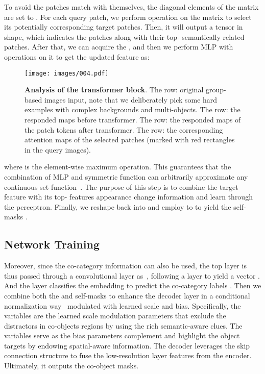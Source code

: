 \documentclass[journal]{IEEEtran}
\begin{document}
To avoid the patches match with themselves, the diagonal elements of the matrix are set to . For each query patch, we perform  operation on the matrix to select its potentially corresponding target patches. Then, it will output a tensor in  shape, which indicates the patches along with their top- semantically related patches. 
After that, we can acquire the , and then we perform MLP with  operations on it to get the updated feature  as:



\begin{figure*}[t]
	\begin{center}
		\centering
		\texttt{[image: images/004.pdf]}
	\end{center}
	
	\caption{\textbf{Analysis of the transformer block}. The  row: original group-based images input, note that we deliberately pick some hard examples with complex backgrounds and multi-objects. The  row: the responded maps before transformer. The  row: the responded maps of the patch tokens after transformer. The  row: the corresponding attention maps of the selected patches (marked with red rectangles in the query images).}
	\label{fig4}
\end{figure*}




where  is the element-wise maximum operation. This guarantees that the combination of MLP and symmetric function can arbitrarily
approximate any continuous set function~\cite{qi2017pointnet}.
The purpose of this step is to combine the target feature with its top- features appearance change information and learn through the perceptron.
Finally, we reshape  back into  and employ  to  to yield the self-masks .





\subsection{Network Training}

Moreover, since the co-category information can also be used, the top layer  is thus passed through a convolutional layer as~\cite{wang2019robust,zhang2020deep}, following a  layer to yield a vector . And the  layer classifies the embedding  to predict the co-category labels .
Then we combine both the  and self-masks  to enhance the decoder layer in a conditional normalization way~\cite{park2019semantic} modulated with learned scale and bias.
Specifically, the variables  are the learned scale modulation parameters that exclude the distractors in co-objects regions by using the rich semantic-aware clues. 
The variables  serve as the bias parameters complement and highlight the object targets by endowing spatial-aware information.
The decoder leverages the skip connection structure to fuse the low-resolution layer features from the encoder.
Ultimately, it outputs the co-object masks.
\end{document}
